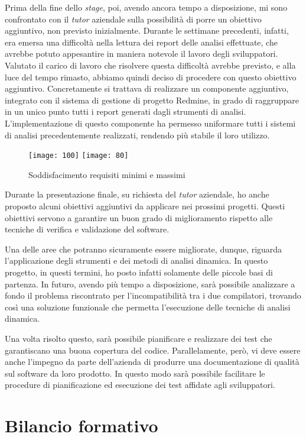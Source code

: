 Prima della fine dello \textit{stage}, poi, avendo ancora tempo a disposizione, mi sono confrontato con il \textit{tutor} aziendale sulla possibilità di porre un obiettivo aggiuntivo, non previsto inizialmente. Durante le settimane precedenti, infatti, era emersa una difficoltà nella lettura dei report delle analisi effettuate, che avrebbe potuto appesantire in maniera notevole il lavoro degli sviluppatori. Valutato il carico di lavoro che risolvere questa difficoltà avrebbe previsto, e alla luce del tempo rimasto, abbiamo quindi deciso di procedere con questo obiettivo aggiuntivo. Concretamente si trattava di realizzare un componente aggiuntivo, integrato con il sistema di gestione di progetto Redmine, in grado di raggruppare in un unico punto tutti i report generati dagli strumenti di analisi.  L'implementazione di questo componente ha permesso uniformare tutti i sistemi di analisi precedentemente realizzati, rendendo più stabile il loro utilizzo.

\begin{figure}[H]
\centering
\texttt{[image: 100]}\hfil
\texttt{[image: 80]}
\caption{Soddisfacimento requisiti minimi e massimi}
\end{figure}

Durante la presentazione finale, su richiesta del \textit{tutor} aziendale, ho anche proposto alcuni obiettivi aggiuntivi da applicare nei prossimi progetti. Questi obiettivi servono a garantire un buon grado di miglioramento rispetto alle tecniche di verifica e validazione del software.

Una delle aree che potranno sicuramente essere migliorate, dunque, riguarda l'applicazione degli strumenti e dei metodi di analisi dinamica. In questo progetto, in questi termini, ho posto infatti solamente delle piccole basi di partenza. In futuro, avendo più tempo a disposizione, sarà possibile analizzare a fondo il problema riscontrato per l'incompatibilità tra i due compilatori, trovando così una soluzione funzionale che permetta l'esecuzione delle tecniche di analisi dinamica. 

Una volta risolto questo, sarà possibile pianificare e realizzare dei test che garantiscano una buona copertura del codice. Parallelamente, però, vi deve essere anche l'impegno da parte dell'azienda di produrre una documentazione di qualità sul software da loro prodotto. In questo modo sarà possibile facilitare le procedure di pianificazione ed esecuzione dei test affidate agli sviluppatori.


\section{Bilancio formativo}

